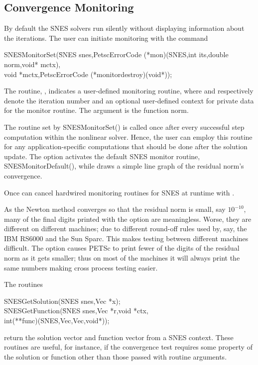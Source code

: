 \subsection{Convergence Monitoring}
\label{sec_snesmonitor}

By default the SNES solvers run silently without displaying information
about the iterations. The user can initiate monitoring with the
command
\begin{tabbing}
  SNESMonitorSet(\=SNES snes,PetscErrorCode (*mon)(SNES,int its,double norm,void* mctx),\\
                 \>        void *mctx,PetscErrorCode (*monitordestroy)(void*));
\end{tabbing}
The routine, , indicates a user-defined monitoring routine,
where  and  respectively denote the iteration
number and an optional user-defined context for private data for the
monitor routine.  The argument  is the function norm.

The routine set by SNESMonitorSet() is called once after every
successful step computation within the nonlinear solver.  Hence, the
user can employ this routine for any application-specific computations
that should be done after the solution update. The option
  activates the default
SNES monitor routine, SNESMonitorDefault(), 
while   draws
a simple line graph of the residual norm's convergence.

Once can cancel hardwired monitoring routines for SNES at runtime with 
. 

As the Newton method converges so that the residual norm is small,
say $ 10^{-10} $, many of the final digits printed with the 
option are meaningless. Worse, they are different on different 
machines; due to different round-off rules used by, say, the IBM RS6000
and the Sun Sparc. This makes testing between different machines
difficult. The option  
causes PETSc to print fewer of the digits of the residual norm 
as it gets smaller; thus on most of the machines it will always
print the same numbers making cross process testing easier.

The routines
\begin{tabbing}
  SNESGetSolution(SNES snes,Vec *x);\\
  SNESGetFunction(\=SNES snes,Vec *r,void *ctx,\\
                  \>        int(**func)(SNES,Vec,Vec,void*));
\end{tabbing}
return the solution vector and function vector from a SNES context. 
These routines are useful, for instance, if the convergence test requires 
some property of the solution or function other than those passed with
routine arguments.

